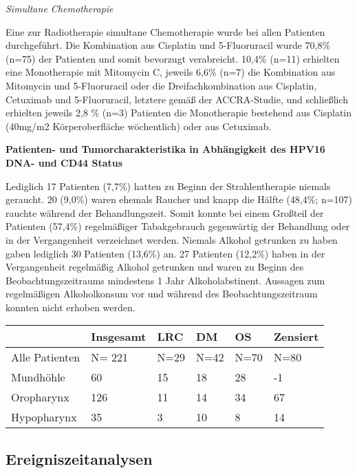 \emph{Simultane Chemotherapie}

Eine zur Radiotherapie simultane Chemotherapie wurde bei allen Patienten durchgeführt. Die Kombination aus Cisplatin und 5-Fluoruracil wurde 70,8\% (n=75) der Patienten und somit bevorzugt verabreicht. 10,4\% (n=11) erhielten eine Monotherapie mit Mitomycin C, jeweils 6,6\% (n=7) die Kombination aus Mitomycin und 5-Fluoruracil oder die Dreifachkombination aus Cisplatin, Cetuximab und 5-Fluoruracil, letztere gemäß der ACCRA-Studie, und schließlich erhielten jeweils 2,8 \% (n=3) Patienten die Monotherapie bestehend aus Cisplatin (40mg/m2 Körperoberfläche wöchentlich) oder aus Cetuximab.

\textbf{Patienten- und Tumorcharakteristika in Abhängigkeit des HPV16 DNA- und CD44 Status}

Lediglich 17 Patienten (7,7\%) hatten zu Beginn der Strahlentherapie niemals geraucht. 20 (9,0\%) waren ehemals Raucher und knapp die Hälfte (48,4\%; n=107) rauchte während der Behandlungszeit. Somit konnte bei einem Großteil der Patienten (57,4\%) regelmäßiger Tabakgebrauch gegenwärtig der Behandlung oder in der Vergangenheit verzeichnet werden. Niemals Alkohol getrunken zu haben gaben lediglich 30 Patienten (13,6\%) an. 27 Patienten (12,2\%) haben in der Vergangenheit regelmäßig Alkohol getrunken und waren zu Beginn des Beobachtungszeitraums mindestens 1 Jahr Alkoholabstinent. Aussagen zum regelmäßigen Alkoholkonsum vor und während des Beobachtungszeitraum konnten nicht erhoben werden.

\begin{tablenos:no-prefix-table-caption}

\begin{longtable}[]{@{}llllll@{}}
\toprule()
& Insgesamt & LRC & DM & OS & Zensiert \\
\midrule()
\endhead
Alle Patienten & N= 221 & N=29 & N=42 & N=70 & N=80 \\
Mundhöhle & 60 & 15 & 18 & 28 & -1 \\
Oropharynx & 126 & 11 & 14 & 34 & 67 \\
Hypopharynx & 35 & 3 & 10 & 8 & 14 \\
\bottomrule()
\end{longtable}

\end{tablenos:no-prefix-table-caption}

\hypertarget{ereigniszeitanalysen}{%
\subsection{Ereigniszeitanalysen}\label{ereigniszeitanalysen}}


